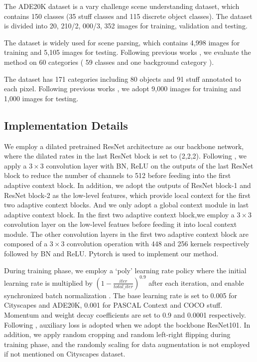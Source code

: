 \documentclass[10pt,twocolumn,letterpaper]{article}
\begin{document}
 The ADE20K dataset is a vary challenge scene understanding dataset, which  contains 150 classes (35 stuff classes and 115 discrete object classes). The dataset is divided into 20, 210/2, 000/3, 352 images for training, validation and testing. 

 The dataset is widely used for scene parsing, which contains 4,998 images for training and 5,105 images for testing. Following previous works \cite{refinenet,encnet}, we evaluate the method on  60 categories ( 59
classes  and one background category ).

  The dataset has 171 categories including 80 objects and 91 stuff
annotated to each pixel.  Following previous works \cite{ding2018context,DAGRNN,refinenet}, we adopt 9,000 images for training and 1,000 images for testing. 


\subsection{Implementation Details}

 We employ a dilated pretrained ResNet architecture as our backbone network, where the dilated rates in the last ResNet block is set to (2,2,2). 
Following \cite{encnet,pspnet}, we  apply a $3 \times3$ convolution layer with BN, ReLU on the outputs of the last ResNet block to reduce the number of channels to 512 before feeding into the first adaptive context block.
In addition, we adopt the outputs of ResNet block-1 and ResNet block-2 as the low-level features, which provide local context for  the first two adaptive context blocks. And we only adopt a global context module in last adaptive context block. In the first two adaptive context block,we employ a $3 \times3$ convolution layer on  the low-level featues before feeding it into local context module. The other convolution layers in the first two adaptive context block are composed of a $3 \times3$ convolution operation with 448 and 256 kernels respectively followed by BN and ReLU. Pytorch is used to implement our method.

During training phase, we employ a ‘poly’ learning rate policy where
the initial learning rate is multiplied by $(1-\frac{iter}{total\_iter})^{0.9}$ after each iteration, and enable synchronized batch normalization \cite{encnet}. The base learning rate is set to 0.005 for Cityscapes and  ADE20K, 0.001  for PASCAL Context and COCO stuff. Momentum and weight decay  coefficients are set to 0.9 and 0.0001 respectively. Following \cite{pspnet}, auxiliary loss is adopted when we adopt the bockbone ResNet101.
In addition, we apply  random cropping and random left-right flipping during training phase, and the randomly scaling for data  augmentation is not employed if not mentioned on Cityscapes dataset.
\end{document}
